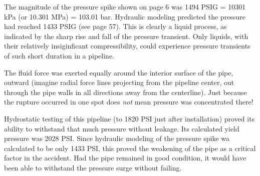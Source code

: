 







The magnitude of the pressure spike shown on page 6 was 1494 PSIG = 10301 kPa (or 10.301 MPa) = 103.01 bar.  Hydraulic modeling predicted the pressure had reached 1433 PSIG (see page 57).  This is clearly a liquid process, as indicated by the sharp rise and fall of the pressure transient.  Only liquids, with their relatively insiginficant compressibility, could experience pressure transients of such short duration in a pipeline.

\vskip 10pt

The fluid force was exerted equally around the interior surface of the pipe, outward (imagine radial force lines projecting from the pipeline center, out through the pipe walls in all directions away from the centerline).  Just because the rupture occurred in one spot does {\it not} mean pressure was concentrated there!

\vskip 10pt

Hydrostatic testing of this pipeline (to 1820 PSI just after installation) proved its ability to withstand that much pressure without leakage.  Its calculated yield pressure was 2028 PSI.  Since hydraulic modeling of the pressure spike wa calculated to be only 1433 PSI, this proved the weakening of the pipe as a critical factor in the accident.  Had the pipe remained in good condition, it would have been able to withstand the pressure surge without failing.




